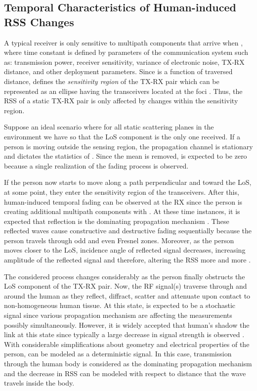 \documentclass[journal, 10pt, twocolumn, balance]{IEEEtran}
\begin{document}
\subsection{Temporal Characteristics of Human-induced RSS Changes}\label{S:temporal_characteristics}

A typical receiver is only sensitive to multipath components that arrive when , where time constant  is defined by parameters of the communication system such as: transmission power, receiver sensitivity, variance of electronic noise, TX-RX distance, and other deployment parameters. Since  is a function of traversed distance,  defines the \emph{sensitivity region} of the TX-RX pair which can be represented as an ellipse having the transceivers located at the foci \cite{Chang2004}. Thus, the RSS of a static TX-RX pair is only affected by changes within the sensitivity region.

Suppose an ideal scenario where for all static scattering planes in the environment we have  so that the LoS component is the only one received. If a person is moving outside the sensing region, the propagation channel is stationary and  dictates the statistics of . Since the mean is removed,  is expected to be zero because a single realization of the fading process is observed.

If the person now starts to move along a path perpendicular and toward the LoS, at some point, they enter the sensitivity region of the transceivers. After this, human-induced temporal fading can be observed at the RX since the person is creating additional multipath components with . At these time instances, it is expected that reflection is the dominating propagation mechanism \cite{patwari2011b}. These reflected waves cause constructive and destructive fading sequentially because the person travels through odd and even Fresnel zones. Moreover, as the person moves closer to the LoS, incidence angle of reflected signal decreases, increasing amplitude of the reflected signal and therefore, altering the RSS more and more \cite[pp. 114-125]{rappaport1996}.

The considered process changes considerably as the person finally obstructs the LoS component of the TX-RX pair. Now, the RF signal(s) traverse through and around the human as they reflect, diffract, scatter and attenuate upon contact to non-homogeneous human tissue. At this state,  is expected to be a stochastic signal since various propagation mechanism are affecting the measurements  possibly simultaneously.  However, it is widely accepted that human's shadow the link at this state since typically a large decrease in signal strength is observed \cite{patwari08, li2011, Guo2013}. With considerable simplifications about geometry and electrical properties of the person,  can be modeled as a deterministic signal. In this case, transmission through the human body is considered as the dominating propagation mechanism and the decrease in RSS can be modeled with respect to distance that the wave travels inside the body.  
\end{document}
